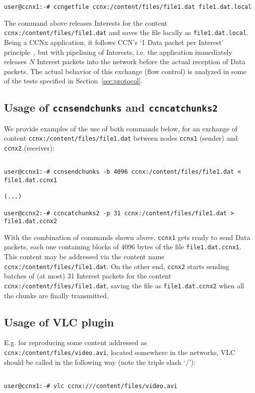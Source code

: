 \begin{verbatim}
user@ccnx1:-# ccngetfile ccnx:/content/files/file1.dat file1.dat.local
\end{verbatim}

The command above releases Interests for the content 
\verb+ccnx:/content/files/file1.dat+ and saves the file locally as 
\verb+file1.dat.local+. Being a CCNx application, it follows CCN's `1 Data packet 
per Interest' principle~\cite{Jacobson2009}, but with pipelining of Interests, 
i.e. the application immediately releases $N$ Interest packets into the network 
before the actual reception of Data packets. The actual behavior of this 
exchange (flow control) is analyzed in some of the tests specified in 
Section~\ref{sec:protocol}.

\cprotect\subsection{Usage of \verb+ccnsendchunks+ and \verb+ccncatchunks2+}

We provide examples of the use 
of both commands below, for an exchange of content 
\verb+ccnx:/content/files/file1.dat+ between nodes \verb+ccnx1+ (sender) 
and \verb+ccnx2+ (receiver):

\begin{verbatim}

user@ccnx1:-# ccnsendchunks -b 4096 ccnx:/content/files/file1.dat < file1.dat.ccnx1

(...)

user@ccnx2:-# ccncatchunks2 -p 31 ccnx:/content/files/file1.dat > file1.dat.ccnx2

\end{verbatim}

With the combination of commands shown above, \verb+ccnx1+ gets ready to 
send Data packets, each one containing blocks of 4096 bytes of the 
file \verb+file1.dat.ccnx1+. This content may be addressed via 
the content name \verb+ccnx:/content/files/file1.dat+. On the other end, 
\verb+ccnx2+ starts sending batches of (at most) 31 Interest packets for the 
content \verb+ccnx:/content/files/file1.dat+, saving the file as 
\verb+file1.dat.ccnx2+ when all the chunks are finally transmitted.

\cprotect\subsection{Usage of VLC plugin}

E.g. for reproducing some content addressed 
as \verb+ccnx:/content/files/video.avi+, located somewhere in the 
networks, VLC should be called in the following way (note the triple slash `\slash'):

\begin{verbatim}

user@ccnx1:-# vlc ccnx:///content/files/video.avi

\end{verbatim}
